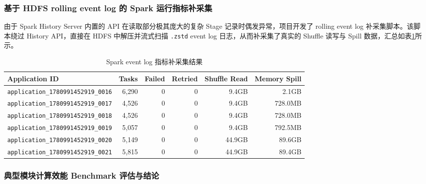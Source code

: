 \subsubsection{基于 HDFS rolling event log 的 Spark 运行指标补采集}

由于 Spark History Server 内置的 API 在读取部分极其庞大的复杂 Stage 记录时偶发异常，项目开发了 rolling event log 补采集脚本。该脚本绕过 History API，直接在 HDFS 中解压并流式扫描 \texttt{.zstd} event log 日志，从而补采集了真实的 Shuffle 读写与 Spill 数据，汇总如表\ref{tab:history-results}所示。

\begin{table}[H]
    \centering
    \caption{Spark event log 指标补采集结果}
    \label{tab:history-results}
    \scriptsize
    \begin{tabular}{l r r r r r}
        \toprule
        \textbf{Application ID}                   & \textbf{Tasks} & \textbf{Failed} & \textbf{Retried} & \textbf{Shuffle Read} & \textbf{Memory Spill} \\
        \midrule
        \texttt{application\_1780991452919\_0016} & 6,290          & 0               & 0                & 9.4GB                 & 2.1GB                 \\
        \texttt{application\_1780991452919\_0017} & 4,526          & 0               & 0                & 9.4GB                 & 728.0MB               \\
        \texttt{application\_1780991452919\_0018} & 4,526          & 0               & 0                & 9.4GB                 & 728.0MB               \\
        \texttt{application\_1780991452919\_0019} & 5,057          & 0               & 0                & 9.4GB                 & 792.5MB               \\
        \texttt{application\_1780991452919\_0020} & 5,149          & 0               & 0                & 44.9GB                & 89.6GB                \\
        \texttt{application\_1780991452919\_0021} & 5,815          & 0               & 0                & 44.9GB                & 89.4GB                \\
        \bottomrule
    \end{tabular}
\end{table}


\subsubsection{典型模块计算效能 Benchmark 评估与结论}

